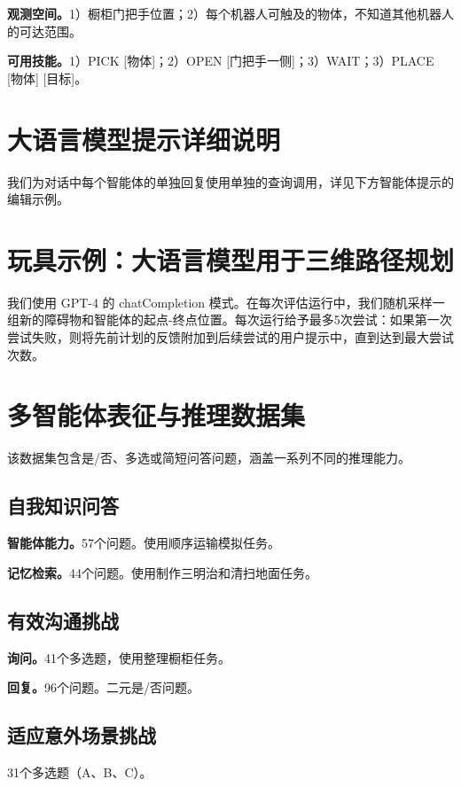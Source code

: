 \documentclass[UTF8, a4paper, 12pt]{article}
\begin{document}
\textbf{观测空间。}1）橱柜门把手位置；2）每个机器人可触及的物体，不知道其他机器人的可达范围。

\textbf{可用技能。}1）PICK [物体]；2）OPEN [门把手一侧]；3）WAIT；3）PLACE [物体] [目标]。

\section{大语言模型提示详细说明}

我们为对话中每个智能体的单独回复使用单独的查询调用，详见下方智能体提示的编辑示例。

\section{玩具示例：大语言模型用于三维路径规划}

我们使用 GPT-4 的 chatCompletion 模式。在每次评估运行中，我们随机采样一组新的障碍物和智能体的起点-终点位置。每次运行给予最多5次尝试：如果第一次尝试失败，则将先前计划的反馈附加到后续尝试的用户提示中，直到达到最大尝试次数。

\section{多智能体表征与推理数据集}

该数据集包含是/否、多选或简短问答问题，涵盖一系列不同的推理能力。

\subsection{自我知识问答}

\textbf{智能体能力。}57个问题。使用顺序运输模拟任务。

\textbf{记忆检索。}44个问题。使用制作三明治和清扫地面任务。

\subsection{有效沟通挑战}

\textbf{询问。}41个多选题，使用整理橱柜任务。

\textbf{回复。}96个问题。二元是/否问题。

\subsection{适应意外场景挑战}

31个多选题（A、B、C）。
\end{document}

